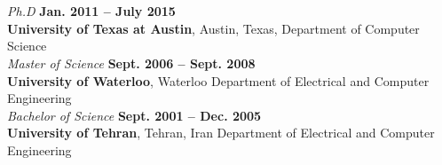 \documentclass[margin,line,letterpaper]{resume-small}
\begin{document}
\begin{resume}
\begin{small}
    \section{\mysidestyle ~}
    \textsl{Ph.D}  \hfill \textbf{ Jan. 2011 -- July 2015}\\
    \textbf{University of Texas at Austin}, Austin, Texas, Department of Computer Science\\
%    
    \textsl{Master of Science} \hfill \textbf{ Sept. 2006 -- Sept. 2008}\\\vspace{0mm}%
    \textbf{University of Waterloo}, Waterloo
    Department of Electrical and Computer Engineering\\%
\textsl{Bachelor of Science} \hfill \textbf{ Sept. 2001 -- Dec. 2005}\\
   \textbf{University of Tehran}, Tehran, Iran
    Department of Electrical and Computer Engineering
\vspace{-1mm}



\end{small}
\end{resume}
\end{document}
